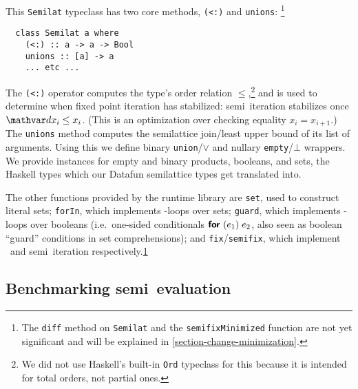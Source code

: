 \label{section-runtime}

This \lstinline{Semilat} typeclass has two core methods, \lstinline{(<:)} and \lstinline{unions}:%
%
\footnote{The \lstinline{diff} method on \lstinline{Semilat} and the \lstinline{semifixMinimized} function are not yet significant and will be explained in \cref{section-change-minimization}.\label{footnote-diff}}

\begin{lstlisting}
  class Semilat a where
    (<:) :: a -> a -> Bool
    unions :: [a] -> a
    ... etc ...
\end{lstlisting}

\noindent
The \lstinline{(<:)} operator computes the type's order relation $\le$,\footnote{We did not use Haskell's built-in \lstinline{Ord} typeclass for this because it is intended for total orders, not partial ones.} and is used to determine when fixed point iteration has stabilized: semi\naive\ iteration stabilizes once $\dx_i \le x_i$.
%
(This is an optimization over checking equality $x_i = x_{i+1}$.)
%
The \lstinline{unions} method computes the semilattice join/least upper bound of its list of arguments.
%
Using this we define binary \lstinline{union}/$\vee$ and nullary \lstinline{empty}/$\bot$ wrappers.
%
We provide instances for empty and binary products, booleans, and sets, the Haskell types which our Datafun semilattice types get translated into.

The other functions provided by the runtime library are \lstinline{set}, used to construct literal sets; \lstinline{forIn}, which implements -loops over sets; \lstinline{guard}, which implements -loops over booleans (i.e.\ one-sided conditionals $\efor{e_1} e_2$, also seen as boolean ``guard'' conditions in set comprehensions); and \lstinline{fix}/\lstinline{semifix}, which implement \naive\ and semi\naive\ iteration respectively.\cref{footnote-diff}





\subsection{Benchmarking semi\naive\ evaluation}\label{section-benchmarks}


